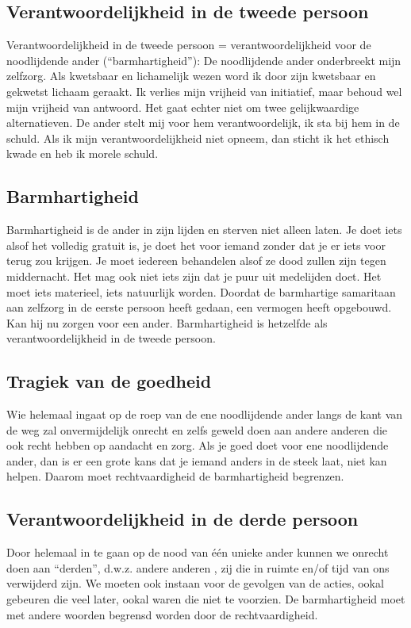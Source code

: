 \documentclass[11pt,a4paper,titlepage]{article}
\begin{document}
\subsection{Verantwoordelijkheid in de tweede persoon}
Verantwoordelijkheid in de tweede persoon = verantwoordelijkheid voor de noodlijdende ander (``barmhartigheid”): De noodlijdende ander onderbreekt mijn zelfzorg. Als kwetsbaar en lichamelijk wezen word ik door zijn kwetsbaar en gekwetst lichaam geraakt. Ik verlies mijn vrijheid van initiatief, maar behoud wel mijn vrijheid van antwoord. Het gaat echter niet om twee gelijkwaardige alternatieven. De ander stelt mij voor hem verantwoordelijk, ik sta bij hem in de schuld. Als ik mijn verantwoordelijkheid niet opneem, dan sticht ik het ethisch kwade en heb ik morele schuld.

\subsection{Barmhartigheid}
Barmhartigheid is de ander in zijn lijden en sterven niet alleen laten. Je doet iets alsof het volledig gratuit is, je doet het voor iemand zonder dat je er iets voor terug zou krijgen. Je moet iedereen behandelen alsof ze dood zullen zijn tegen middernacht. Het mag ook niet iets zijn dat je puur uit medelijden doet. Het moet iets materieel, iets natuurlijk worden. Doordat de barmhartige samaritaan aan zelfzorg in de eerste persoon heeft gedaan, een vermogen heeft opgebouwd. Kan hij nu zorgen voor een ander. Barmhartigheid is hetzelfde als verantwoordelijkheid in de tweede persoon.

\subsection{Tragiek van de goedheid}
Wie helemaal ingaat op de roep van de ene noodlijdende ander langs de kant van de weg zal onvermijdelijk onrecht en zelfs geweld doen aan andere anderen die ook recht hebben op aandacht en zorg. Als je goed doet voor ene noodlijdende ander, dan is er een grote kans dat je iemand anders in de steek laat, niet kan helpen. Daarom moet rechtvaardigheid de barmhartigheid begrenzen.

\subsection{Verantwoordelijkheid in de derde persoon}
Door helemaal in te gaan op de nood van één unieke ander kunnen we onrecht doen aan ``derden”, d.w.z. andere anderen , zij die in ruimte en/of tijd van ons verwijderd zijn. We moeten ook instaan voor de gevolgen van de acties, ookal gebeuren die veel later, ookal waren die niet te voorzien. De barmhartigheid moet met andere woorden begrensd worden door de rechtvaardigheid.
\end{document}

